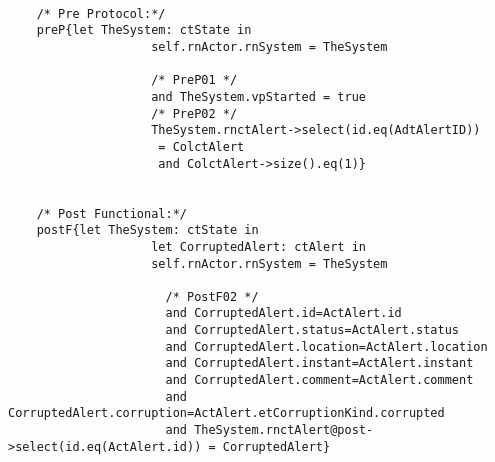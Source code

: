 	\scriptsize
	\vspace{0.5cm}
	\begin{lstlisting}[style=MessirStyle,firstnumber=auto,captionpos=b,caption={\msrmessir (MCL-oriented) specification of the operation \emph{oeCorruptAlert}.},label=OM-actCorrupter-oeCorruptAlert-MCL-LST]

	/* Pre Protocol:*/ 
	preP{let TheSystem: ctState in
	  				self.rnActor.rnSystem = TheSystem
	  			  
					/* PreP01 */
					and TheSystem.vpStarted = true
					/* PreP02 */
					TheSystem.rnctAlert->select(id.eq(AdtAlertID))
					 = ColctAlert
					 and ColctAlert->size().eq(1)}
	
	
	/* Post Functional:*/ 
	postF{let TheSystem: ctState in
	  				let CorruptedAlert: ctAlert in
	  				self.rnActor.rnSystem = TheSystem
	  				
					  /* PostF02 */
	  				  and CorruptedAlert.id=ActAlert.id
	  				  and CorruptedAlert.status=ActAlert.status
	  				  and CorruptedAlert.location=ActAlert.location
	  				  and CorruptedAlert.instant=ActAlert.instant
	  				  and CorruptedAlert.comment=ActAlert.comment
	  				  and CorruptedAlert.corruption=ActAlert.etCorruptionKind.corrupted
	  				  and TheSystem.rnctAlert@post->select(id.eq(ActAlert.id)) = CorruptedAlert}
	
	
	\end{lstlisting}
	\normalsize 
	
	
	
	





